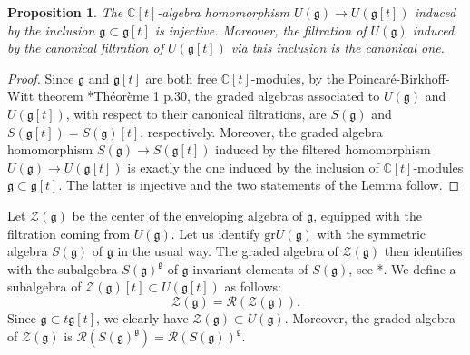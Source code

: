 \documentclass{amsart}
\newtheorem{proposition}[theorem]{Proposition}
\theoremstyle{definition}
\begin{document}
\begin{proposition}
    The $\mathbb{C}[t]$-algebra homomorphism $U(\bm{\mathfrak{g}}) \to U(\mathfrak{g}[t])$ induced by the inclusion $\bm{\mathfrak{g}} \subset \mathfrak{g}[t]$ is injective. Moreover, the filtration of $U(\bm{\mathfrak{g}})$ induced by the canonical filtration of $U(\mathfrak{g}[t])$ via this inclusion is the canonical one.
\end{proposition}

\begin{proof}
    Since $\bm{\mathfrak{g}}$ and $\mathfrak{g}[t]$ are both free $\mathbb{C}[t]$-modules,  by the Poincaré-Birkhoff-Witt theorem \cite{GrAlLie1}*{Théorème 1 p.30}, the graded algebras associated to $U(\bm{\mathfrak{g}})$ and $U(\mathfrak{g}[t])$, with respect to their canonical filtrations, are $S(\bm{\mathfrak{g}})$ and $S(\mathfrak{g}[t]) = S(\mathfrak{g})[t]$, respectively. Moreover, the graded algebra homomorphism $S(\bm{\mathfrak{g}}) \to S(\mathfrak{g}[t])$ induced by the filtered homomorphism $U(\bm{\mathfrak{g}}) \to U(\mathfrak{g}[t])$ is exactly the one induced by the inclusion of $\mathbb{C}[t]$-modules $\bm{\mathfrak{g}} \subset \mathfrak{g}[t]$. The latter is injective and the two statements of the Lemma follow.
\end{proof}

Let $\mathcal{Z}(\mathfrak{g})$ be the center of the enveloping algebra of $\mathfrak{g}$, equipped with the filtration coming from $U(\mathfrak{g})$. Let us identify $\mathrm{gr} U(\mathfrak{g})$ with the symmetric algebra $S(\mathfrak{g})$ of $\mathfrak{g}$ in the usual way. The graded algebra of $\mathcal{Z}(\mathfrak{g})$ then identifies with the subalgebra $S(\mathfrak{g})^\mathfrak{g}$ of $\mathfrak{g}$-invariant elements of $S(\mathfrak{g})$, see \cite{Wallach}*{}. We define a subalgebra of $\mathcal{Z}(\mathfrak{g})[t] \subset U(\mathfrak{g}[t])$ as follows:
\[\mathcal{Z}(\bm{\mathfrak{g}}) = \mathcal{R} (\mathcal{Z}(\mathfrak{g})). \]
Since $\bm{\mathfrak{g}} \subset t\mathfrak{g}[t]$, we clearly have $\mathcal{Z}(\bm{\mathfrak{g}}) \subset U(\bm{\mathfrak{g}})$. Moreover, the graded algebra of $\mathcal{Z}(\bm{\mathfrak{g}})$ is $\mathcal{R}(S(\mathfrak{g})^\mathfrak{g}) = \mathcal{R}(S(\mathfrak{g}))^\mathfrak{g}$.
\end{document}
